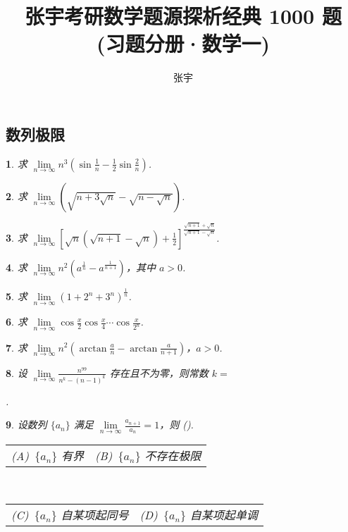 \documentclass[openany,twocolumn]{ctexbook}
\title{张宇考研数学题源探析经典 1000 题\\(习题分册·数学一)}
\author{张宇}
\makeatletter
\theoremstyle{change}
\newtheorem{ti}{}[section]
\newcommand{\hone}[1]{ \uline{\hspace{#1 pc}}}
\def\kuo{ (\hspace{1pc})}
\newcommand{\twoch}[4]{\\\begin{tabular}{*{2}{@{}p{3.94cm}}}(A)~#1 & (B)~#2\end{tabular}\\\begin{tabular}{*{2}{@{}p{3.94cm}}}(C)~#3 & (D)~#4\end{tabular}}  %
\edef\lim{\lim\limits}
\makeatother
\begin{document}
	\maketitle
	\frontmatter
	
	\mainmatter
	
	
	\subsection{数列极限}

	\begin{ti}
		求 $\lim_{n \to \infty} n^{3} \left( \sin\frac{1}{n} - \frac{1}{2} \sin\frac{2}{n} \right)$.
	\end{ti}

	\begin{ti}
		求 $\lim_{n \to \infty} \left( \sqrt{n + 3\sqrt{n}} - \sqrt{n - \sqrt{n}} \right)$.
	\end{ti}

	\begin{ti}
		求 $\lim_{n \to \infty} \left[ \sqrt{n}\left( \sqrt{n+1} - \sqrt{n} \right) + \frac{1}{2} \right]^{\frac{\sqrt{n+1} + \sqrt{n}}{\sqrt{n+1} - \sqrt{n}}}$.
	\end{ti}

	\begin{ti}
		求 $\lim_{n \to \infty} n^{2} \left( a^{\frac{1}{n}} - a^{\frac{1}{n+1}} \right)$，其中 $a > 0$.
	\end{ti}

	\begin{ti}
		求 $\lim_{n \to \infty} \left( 1 + 2^{n} + 3^{n} \right)^{\frac{1}{n}}$.
	\end{ti}

	\begin{ti}
		求 $\lim_{n \to \infty} \cos\frac{x}{2}\cos\frac{x}{4}\cdots \cos\frac{x}{2^{n}}$.
	\end{ti}

	\begin{ti}
		求 $\lim_{n \to \infty} n^{2}\left( \arctan\frac{a}{n} - \arctan \frac{a}{n+1} \right)$，$a > 0$.
	\end{ti}

	\begin{ti}
		设 $\lim_{n \to \infty} \frac{n^{99}}{n^{k} - (n-1)^{k}}$ 存在且不为零，则常数 $k =$
		
		\noindent\hone{2}.
	\end{ti}

	\begin{ti}
		设数列 $\{ a_{n} \}$ 满足 $\lim_{n \to \infty}\frac{a_{n+1}}{a_{n}} = 1$，则\kuo.
		\twoch{$\{ a_{n} \}$ 有界}{$\{ a_{n} \}$ 不存在极限}{$\{ a_{n} \}$ 自某项起同号}{$\{ a_{n} \}$ 自某项起单调}
	\end{ti}
\end{document}
